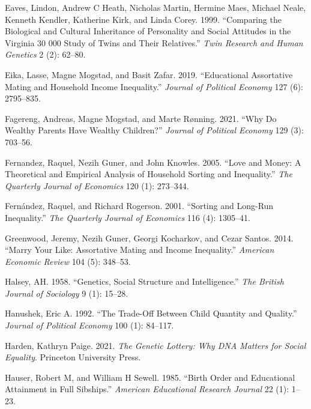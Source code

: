 \documentclass[
  12pt,
]{article}
\newlength{\cslhangindent}
\newlength{\cslentryspacingunit} %
\newenvironment{CSLReferences}[2] %
 {%
  \setlength{\parindent}{0pt}
  \ifodd #1
  \let\oldpar\par
  \def\par{\hangindent=\cslhangindent\oldpar}
  \fi
  \setlength{\parskip}{#2\cslentryspacingunit}
 }%
 {}
\theoremstyle{definition}
\theoremstyle{definition}
\theoremstyle{definition}
\theoremstyle{definition}
\theoremstyle{remark}
\begin{document}
\begin{CSLReferences}{1}{0}
\leavevmode{}%
Eaves, Lindon, Andrew C Heath, Nicholas Martin, Hermine Maes, Michael Neale, Kenneth Kendler, Katherine Kirk, and Linda Corey. 1999. {``Comparing the Biological and Cultural Inheritance of Personality and Social Attitudes in the Virginia 30 000 Study of Twins and Their Relatives.''} \emph{Twin Research and Human Genetics} 2 (2): 62--80.

\leavevmode{}%
Eika, Lasse, Magne Mogstad, and Basit Zafar. 2019. {``Educational Assortative Mating and Household Income Inequality.''} \emph{Journal of Political Economy} 127 (6): 2795--835.

\leavevmode{}%
Fagereng, Andreas, Magne Mogstad, and Marte Rønning. 2021. {``Why Do Wealthy Parents Have Wealthy Children?''} \emph{Journal of Political Economy} 129 (3): 703--56.

\leavevmode{}%
Fernandez, Raquel, Nezih Guner, and John Knowles. 2005. {``Love and Money: A Theoretical and Empirical Analysis of Household Sorting and Inequality.''} \emph{The Quarterly Journal of Economics} 120 (1): 273--344.

\leavevmode{}%
Fernández, Raquel, and Richard Rogerson. 2001. {``Sorting and Long-Run Inequality.''} \emph{The Quarterly Journal of Economics} 116 (4): 1305--41.

\leavevmode{}%
Greenwood, Jeremy, Nezih Guner, Georgi Kocharkov, and Cezar Santos. 2014. {``Marry Your Like: Assortative Mating and Income Inequality.''} \emph{American Economic Review} 104 (5): 348--53.

\leavevmode{}%
Halsey, AH. 1958. {``Genetics, Social Structure and Intelligence.''} \emph{The British Journal of Sociology} 9 (1): 15--28.

\leavevmode{}%
Hanushek, Eric A. 1992. {``The Trade-Off Between Child Quantity and Quality.''} \emph{Journal of Political Economy} 100 (1): 84--117.

\leavevmode{}%
Harden, Kathryn Paige. 2021. \emph{The Genetic Lottery: Why DNA Matters for Social Equality}. Princeton University Press.

\leavevmode{}%
Hauser, Robert M, and William H Sewell. 1985. {``Birth Order and Educational Attainment in Full Sibships.''} \emph{American Educational Research Journal} 22 (1): 1--23.


\end{CSLReferences}
\end{document}
